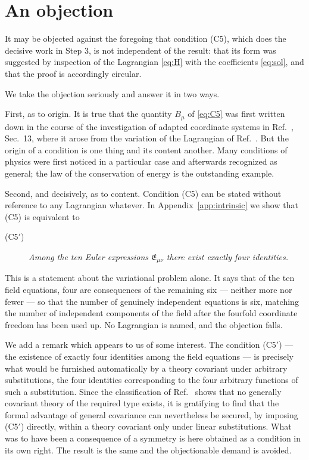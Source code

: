 \documentclass[aps,prd,reprint,amsmath,amssymb,nofootinbib,longbibliography]{revtex4-2}
\begin{document}
\section{An objection}
\label{sec:objection}

It may be objected against the foregoing that condition (C5), which does the decisive work in
Step 3, is not independent of the result: that its form was suggested by inspection of the
Lagrangian \eqref{eq:H} with the coefficients \eqref{eq:sol}, and that the proof is accordingly
circular.

We take the objection seriously and answer it in two ways.

First, as to origin. It is true that the quantity $B_{\mu}$ of \eqref{eq:C5} was first written down
in the course of the investigation of adapted coordinate systems in Ref.~\cite{ein1914}, Sec.~13,
where it arose from the variation of the Lagrangian of Ref.~\cite{eingross1913}. But the origin of a
condition is one thing and its content another. Many conditions of physics were first noticed in a
particular case and afterwards recognized as general; the law of the conservation of energy is the
outstanding example.

Second, and decisively, as to content. Condition (C5) can be stated without reference to any
Lagrangian whatever. In Appendix~\ref{app:intrinsic} we show that (C5) is equivalent to

\begin{description}
\item[(C5$'$)] \emph{Among the ten Euler expressions $\mathfrak{E}_{\mu\nu}$ there exist exactly
four identities.}
\end{description}

\noindent This is a statement about the variational problem alone. It says that of the ten field
equations, four are consequences of the remaining six --- neither more nor fewer --- so that the
number of genuinely independent equations is six, matching the number of independent components of
the field after the fourfold coordinate freedom has been used up. No Lagrangian is named, and the
objection falls.

We add a remark which appears to us of some interest. The condition (C5$'$) --- the existence of
exactly four identities among the field equations --- is precisely what would be furnished
automatically by a theory covariant under arbitrary substitutions, the four identities corresponding
to the four arbitrary functions of such a substitution. Since the classification of
Ref.~\cite{paperD} shows that no generally covariant theory of the required type exists, it is
gratifying to find that the formal advantage of general covariance can nevertheless be secured, by
imposing (C5$'$) directly, within a theory covariant only under linear substitutions. What was to
have been a consequence of a symmetry is here obtained as a condition in its own right. The result
is the same and the objectionable demand is avoided.
\end{document}
